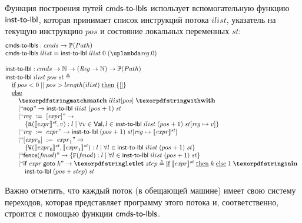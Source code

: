 Функция построения путей $\textup{\sf cmds-to-lbls}$ использует вспомогательную функцию $\textup{\sf inst-to-lbl}$,
которая принимает список инструкций потока $ilist$, указатель на текущую инструкцию $pos$ и
состояние локальных переменных $st$:
\[
\inarr{
  \cmdsToLbls : \Carm \rightarrow \Pset(\Path) \\
  \cmdsToLbls \; ilist = \instToLbl \; ilist \; 0 \; (\lambda \reg. 0) \\
  \\
  \instToLbl : \Carm \rightarrow \mathbb{N} \rightarrow (\Reg \rightarrow \mathbb{N}) \rightarrow \Pset(\Path) \\
  \instToLbl \; ilist \; pos \; \PromState \defeq \\
  \quad \textIf   pos < 0 \; || \; pos > length(ilist) \; \textThen \{ [] \} \\
  \quad \textElse \\
  \qquad \kw{match} \; ilist[pos] \; \kw{with} \\
  \qquad
    \begin{array}{@{}l}
    | ``\nop" \rightarrow \instToLbl \; ilist \; (pos + 1) \; \PromState \\
    | ``\readInst{\reg}{\expr}" \rightarrow \\
      \quad \{ \rlab{}{\semState{\expr}{\PromState}}{\val} : l \mid
      \forall \val \in \Val, l \in \instToLbl \; ilist \; (pos + 1) \; \PromState[\reg \mapsto \val] \} \\
    | ``\assignInst{\reg}{\expr}" \rightarrow
                 \instToLbl \; (pos + 1) \; \PromState[\reg \mapsto \semState{\expr}{\PromState}] \\
    | ``\writeInst{\expr_0}{\expr_1}" \rightarrow \\
      \quad \{ \wlab{}{\semState{\expr_0}{\PromState}}{\semState{\expr_1}{\PromState}} : l \mid
      \forall l \in \instToLbl \; ilist \; (pos + 1) \; \PromState \} \\
    | ``\fenceInst{\FtypeProm}" \rightarrow
      \{ \flab{\FtypeProm} : l \mid \forall l \in \instToLbl \; ilist \; (pos + 1) \; \PromState \} \\
    | ``\ifGotoInst{\expr}{k}" \rightarrow
      \letdef{step}{\textIf \semState{\expr}{\PromState} \; \textThen k \; \textElse 1} \\
      \quad \instToLbl \; (pos + step) \; \PromState \\
  \end{array} \\
}
\]

Важно отметить, что каждый поток (в обещающей машине) имеет свою систему переходов, которая
представляет программу этого потока и, соответственно, строится с помощью функции $\textup{\sf cmds-to-lbls}$.

